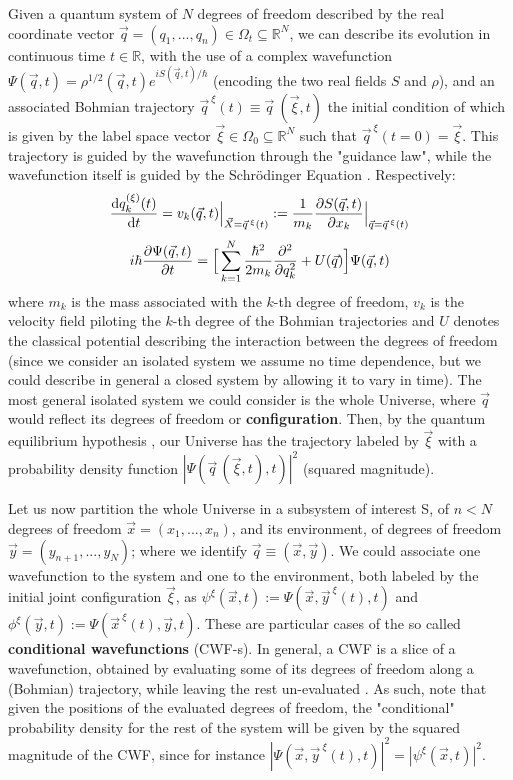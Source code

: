 \documentclass[11pt, a4paper]{article} %
\newcommand{\R}{\mathbb{R}} %
\begin{document}
Given a quantum system of $N$ degrees of freedom described by the real coordinate vector $\vec{q}=(q_1,..., q_n)\in\Omega_t\subseteq\R^N$, we can describe its evolution in continuous time $t\in\R$, with the use of a complex wavefunction $\Psi(\vec{q},t)=\rho^{1/2}(\vec{q},t)e^{iS(\vec{q},t)/\hbar}$ (encoding the two real fields $S$ and $\rho$), and an associated Bohmian trajectory $\vec{q}^{\:\xi}(t)\equiv \vec{q}\:(\vec{\xi},t)$ the initial condition of which is given by the label space vector $\vec{\xi}\in\Omega_0\subseteq\R^N$ such that $\vec{q}^{\:\xi}(t=0)=\vec{\xi}$. This trajectory is guided by the wavefunction through the "guidance law", while the wavefunction itself is guided by the Schrödinger Equation \cite{Bohm,Holland,Durr,JordiXavier}. Respectively:\vspace{-0.2cm}
\begin{equation}\label{GL}
\dv{q_k^{ (\xi)}(t)}{t} = v_k(\vec{q},t)\Big\rvert_{\vec{X}=\vec{q}^{\:\xi}(t)}:=\frac{1}{m_k} \pdv{S(\vec{q},t)}{x_k}\Big\rvert_{\vec{q}=\vec{q}^{\:\xi}(t)}
\end{equation}
\begin{equation}\label{SE}
i\hbar\pdv{\Psi(\vec{q},t)}{t}=\Big[ \sum_{k=1}^N \frac{\hbar^2}{2m_k}\pdv[2]{}{q_k}+U(\vec{q})\Big]\Psi(\vec{q},t)
\end{equation}
where $m_k$ is the mass associated with the $k$-th degree of freedom, $v_k$ is the velocity field piloting the $k$-th degree of the Bohmian trajectories and $U$ denotes the classical potential describing the interaction between the degrees of freedom (since we consider an isolated system we assume no time dependence, but we could describe in general a closed system by allowing it to vary in time). The most general isolated system we could consider is the whole Universe, where $\vec{q}$ would reflect its degrees of freedom or {\bf configuration}. Then, by the quantum equilibrium hypothesis \cite{Absolute}, our Universe has the trajectory labeled by $\vec{\xi}$ with a probability density function $|\Psi(\vec{q}\,(\vec{\xi},t),t)|^2$ (squared magnitude). 

Let us now partition the whole Universe in a subsystem of interest S, of $n<N$ degrees of freedom $\vec{x}=(x_1,...,x_n)$, and its environment, of degrees of freedom $\vec{y}=(y_{n+1},...,y_N)$; where we identify $\vec{q}\equiv (\vec{x},\vec{y})$. We could associate one wavefunction to the system and one to the environment, both labeled by the initial joint configuration $\vec{\xi}$, as $\psi^\xi(\vec{x},t):=\Psi(\vec{x},\vec{y}^{\:\xi}(t),t)$ and $\phi^\xi(\vec{y},t):=\Psi(\vec{x}^{\:\xi}(t),\vec{y},t)$. These are particular cases of the so called {\bf conditional wavefunctions} (CWF-s). In general, a CWF is a slice of a wavefunction, obtained by evaluating some of its degrees of freedom along a (Bohmian) trajectory, while leaving the rest un-evaluated \cite{Absolute, JordiXavier}. As such, note that given the positions of the evaluated degrees of freedom, the "conditional" probability density for the rest of the system will be given by the squared magnitude of the CWF, since for instance $|\Psi(\vec{x},\vec{y}^{\:\xi}(t), t)|^2=|\psi^\xi(\vec{x},t)|^2$.
\end{document}
